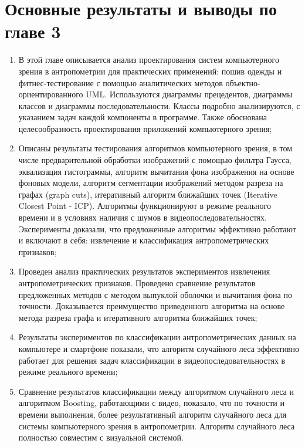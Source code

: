 \section{Основные результаты и выводы по главе 3}

\begin{enumerate}
	\item В этой главе описывается анализ проектирования систем компьютерного зрения в антропометрии для практических применений: пошив одежды и фитнес-тестирование с помощью аналитических методов объектно-ориентированного UML. Используются диаграммы прецедентов, диаграммы классов и диаграммы последовательности. Классы подробно анализируются, с указанием задач каждой компоненты в программе. Также обоснована целесообразность проектирования приложений компьютерного зрения;
	\item Описаны результаты тестирования алгоритмов компьютерного зрения, в том числе предварительной обработки изображений с помощью фильтра Гаусса, эквализация гистограммы, алгоритм вычитания фона изображения на основе фоновых модели, алгоритм сегментации изображений методом разреза на графах (graph cuts), итеративный алгоритм ближайших точек (Iterative Closest Point - ICP). Алгоритмы функционируют в режиме реального времени и в условиях наличия с шумов в видеопоследовательностях. Эксперименты доказали, что предложенные алгоритмы эффективно работают и включают в себя: извлечение и классификация антропометрических признаков;
	\item Проведен анализ практических результатов экспериментов извлечения антропометрических признаков. Проведено сравнение результатов предложенных методов с методом выпуклой оболочки и вычитания фона по точности. Доказывается преимущество приведенного алгоритма на основе метода разреза графа и итеративного алгоритма ближайших точек;
	\item Результаты экспериментов по классификации антропометрических данных на компьютере и смартфоне показали, что алгоритм случайного леса эффективно работает для решения задач классификации в видеопоследовательностях в режиме реального времени;
	\item Сравнение результатов классификации между алгоритмом случайного леса и алгоритмом Boosting, работающими с видео, показало, что по точности и времени выполнения, более результативный алгоритм случайного леса для системы компьютерного зрения в антропометрии. Алгоритм случайного леса полностью совместим с визуальной системой.
\end{enumerate}
